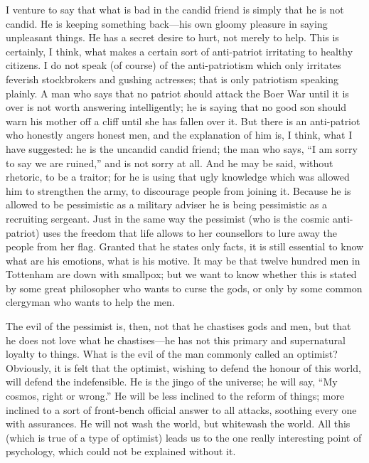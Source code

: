 I venture to say that what is bad in the candid friend is simply that he is not candid. He is keeping something back—his own gloomy pleasure in saying unpleasant things. He has a secret desire to hurt, not merely to help. This is certainly, I think, what makes a certain sort of anti-patriot irritating to healthy citizens. I do not speak (of course) of the anti-patriotism which only irritates feverish stockbrokers and gushing actresses; that is only patriotism speaking plainly. A man who says that no patriot should attack the Boer War until it is over is not worth answering intelligently; he is saying that no good son should warn his mother off a cliff until she has fallen over it. But there is an anti-patriot who honestly angers honest men, and the explanation of him is, I think, what I have suggested: he is the uncandid candid friend; the man who says, “I am sorry to say we are ruined,” and is not sorry at all. And he may be said, without rhetoric, to be a traitor; for he is using that ugly knowledge which was allowed him to strengthen the army, to discourage people from joining it. Because he is allowed to be pessimistic as a military adviser he is being pessimistic as a recruiting sergeant. Just in the same way the pessimist (who is the cosmic anti-patriot) uses the freedom that life allows to her counsellors to lure away the people from her flag. Granted that he states only facts, it is still essential to know what are his emotions, what is his motive. It may be that twelve hundred men in Tottenham are down with smallpox; but we want to know whether this is stated by some great philosopher who wants to curse the gods, or only by some common clergyman who wants to help the men.

The evil of the pessimist is, then, not that he chastises gods and men, but that he does not love what he chastises—he has not this primary and supernatural loyalty to things. What is the evil of the man commonly called an optimist? Obviously, it is felt that the optimist, wishing to defend the honour of this world, will defend the indefensible. He is the jingo of the universe; he will say, “My cosmos, right or wrong.” He will be less inclined to the reform of things; more inclined to a sort of front-bench official answer to all attacks, soothing every one with assurances. He will not wash the world, but whitewash the world. All this (which is true of a type of optimist) leads us to the one really interesting point of psychology, which could not be explained without it.

